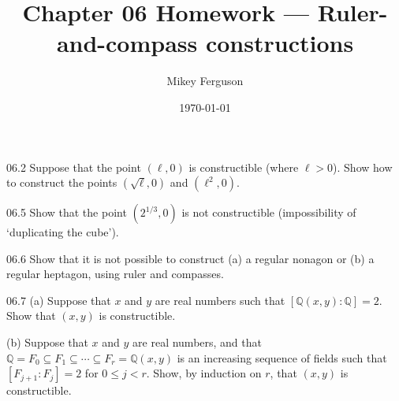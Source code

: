 \documentclass[11pt]{article}
\title{Chapter 06 Homework --- Ruler-and-compass constructions}
\author{Mikey Ferguson}
\date{\today}
\begin{document}
\maketitle

\begin{problem}{06.2}
  Suppose that the point $(\ell,0)$ is constructible (where $\ell>0$).
  Show how to construct the points $(\sqrt{\ell},0)$ and $(\ell^{2},0)$.
\end{problem}

\begin{problem}{06.5}
  Show that the point $(2^{1/3},0)$ is not constructible (impossibility
  of `duplicating the cube').
\end{problem}

\begin{problem}{06.6}
  Show that it is not possible to construct (a) a regular nonagon or
  (b) a regular heptagon, using ruler and compasses.
\end{problem}

\begin{problem}{06.7}
  (a) Suppose that $x$ and $y$ are real numbers such that
  $[\mathbb{Q}(x,y):\mathbb{Q}]=2$. Show that $(x,y)$ is constructible.

  (b) Suppose that $x$ and $y$ are real numbers, and that
  $\mathbb{Q}=F_{0}\subseteq F_{1}\subseteq\cdots\subseteq F_{r}=\mathbb{Q}(x,y)$
  is an increasing sequence of fields such that $[F_{j+1}:F_{j}]=2$ for
  $0\le j<r$. Show, by induction on $r$, that $(x,y)$ is constructible.
\end{problem}
\end{document}
